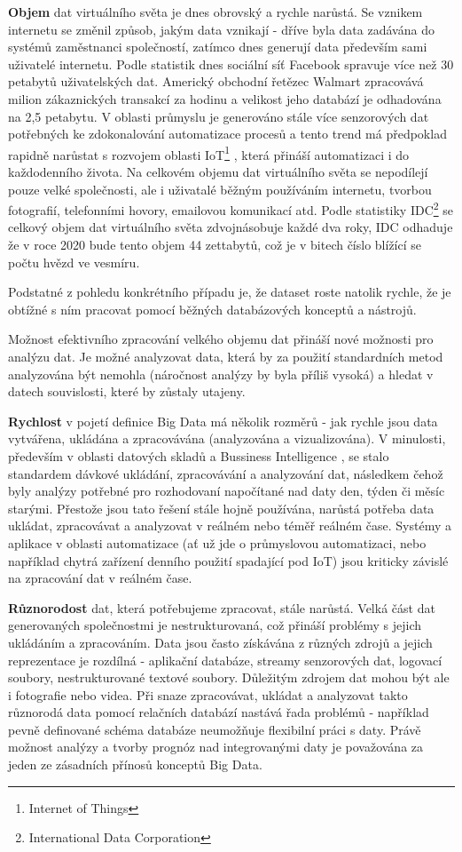 \documentclass[11pt,twoside,a4paper]{book}
\begin{document}
		\textbf{Objem} dat virtuálního světa je dnes obrovský a rychle narůstá. Se vznikem internetu se změnil způsob, jakým data vznikají - dříve byla data zadávána do systémů zaměstnanci společností, zatímco dnes generují data především sami uživatelé internetu. Podle statistik dnes sociální síť Facebook spravuje více než 30 petabytů uživatelských dat. Americký obchodní řetězec Walmart zpracovává milion zákaznických transakcí za hodinu a velikost jeho databází je odhadována na 2,5 petabytu. V oblasti průmyslu je generováno stále více senzorových dat potřebných ke zdokonalování automatizace procesů a tento trend má předpoklad rapidně narůstat s rozvojem oblasti IoT\footnote{Internet of Things} \cite{iot01}, která přináší automatizaci i do každodenního života. Na celkovém objemu dat virtuálního světa se nepodílejí pouze velké společnosti, ale i uživatalé běžným používáním internetu, tvorbou fotografií, telefonními hovory, emailovou komunikací atd. Podle statistiky IDC\footnote{International Data Corporation} \cite{IDC01} se celkový objem dat virtuálního světa zdvojnásobuje každé dva roky, IDC odhaduje že v roce 2020 bude tento objem 44 zettabytů, což je v bitech číslo blížící se počtu hvězd ve vesmíru.

		Podstatné z pohledu konkrétního případu je, že dataset roste natolik rychle, že je obtížné s ním pracovat pomocí běžných databázových konceptů a nástrojů.  
		
		Možnost efektivního zpracování velkého objemu dat přináší nové možnosti pro analýzu dat. Je možné analyzovat data, která by za použití standardních metod analyzována být nemohla (náročnost analýzy by byla příliš vysoká) a hledat v datech souvislosti, které by zůstaly utajeny. 

		\textbf{Rychlost} v pojetí definice Big Data má několik rozměrů - jak rychle jsou data vytvářena, ukládána a zpracovávána (analyzována a vizualizována). V minulosti, především v oblasti datových skladů a Bussiness Intelligence \cite{bi01}, se stalo standardem dávkové ukládání, zpracovávání a analyzování dat, následkem čehož byly analýzy potřebné pro rozhodovaní napočítané nad daty den, týden či měsíc starými. Přestože jsou tato řešení stále hojně používána, narůstá potřeba data ukládat, zpracovávat a analyzovat v reálném nebo téměř reálném čase. Systémy a aplikace v oblasti automatizace (ať už jde o průmyslovou automatizaci, nebo například chytrá zařízení denního použití spadající pod IoT) jsou kriticky závislé na zpracování dat v reálném čase.    
		
		\textbf{Různorodost} dat, která potřebujeme zpracovat, stále narůstá. Velká část dat generovaných společnostmi je nestrukturovaná, což přináší problémy s jejich ukládáním a zpracováním. Data jsou často získávána z různých zdrojů a jejich reprezentace je rozdílná - aplikační databáze, streamy senzorových dat, logovací soubory, nestrukturované textové soubory. Důležitým zdrojem dat mohou být ale i fotografie nebo videa.  Při snaze zpracovávat, ukládat a analyzovat takto různorodá data pomocí relačních databází nastává řada problémů - například pevně definované schéma databáze neumožňuje flexibilní práci s daty. Právě možnost analýzy a tvorby prognóz nad integrovanými daty je považována za jeden ze zásadních přínosů konceptů Big Data. \cite{NVP01}
		
\end{document}
